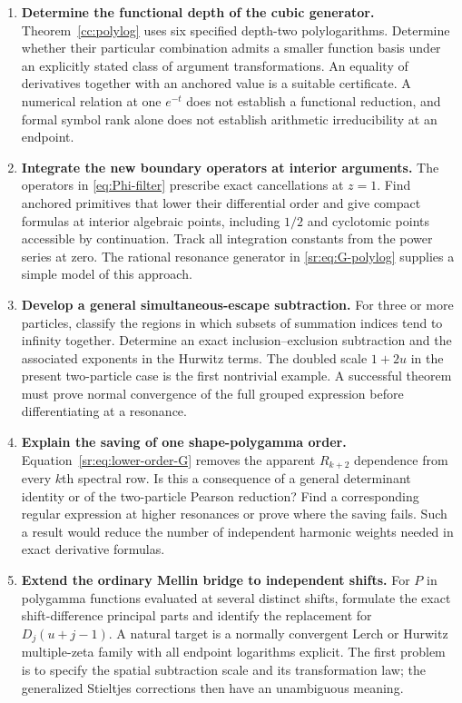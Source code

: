 \documentclass[11pt,letterpaper]{article}
\theoremstyle{definition}
\theoremstyle{remark}
\numberwithin{equation}{section}
\begin{document}
\begin{enumerate}[leftmargin=*,label=\textbf{Q\arabic*.}]
\item \textbf{Determine the functional depth of the cubic generator.}
Theorem~\ref{cc:polylog} uses six specified depth-two polylogarithms.
Determine whether their particular combination admits a smaller function
basis under an explicitly stated class of argument transformations.
An equality of derivatives together with an anchored value is a suitable
certificate. A numerical relation at one $e^{-t}$ does not establish a
functional reduction, and formal symbol rank alone does not establish
arithmetic irreducibility at an endpoint.

\item \textbf{Integrate the new boundary operators at interior arguments.}
The operators in \eqref{eq:Phi-filter} prescribe exact cancellations at
$z=1$. Find anchored primitives that lower their differential order and
give compact formulas at interior algebraic points, including $1/2$ and
cyclotomic points accessible by continuation. Track all integration
constants from the power series at zero. The rational resonance generator
in \eqref{sr:eq:G-polylog} supplies a simple model of this approach.

\item \textbf{Develop a general simultaneous-escape subtraction.}
For three or more particles, classify the regions in which subsets of
summation indices tend to infinity together. Determine an exact
inclusion--exclusion subtraction and the associated exponents in the
Hurwitz terms. The doubled scale $1+2u$ in the present two-particle
case is the first nontrivial example. A successful theorem must prove
normal convergence of the full grouped expression before differentiating
at a resonance.

\item \textbf{Explain the saving of one shape-polygamma order.}
Equation~\eqref{sr:eq:lower-order-G} removes the apparent $R_{k+2}$
dependence from every $k$th spectral row. Is this a consequence of a
general determinant identity or of the two-particle Pearson reduction?
Find a corresponding regular expression at higher resonances or prove
where the saving fails. Such a result would reduce the number of
independent harmonic weights needed in exact derivative formulas.

\item \textbf{Extend the ordinary Mellin bridge to independent shifts.}
For $P$ in polygamma functions evaluated at several distinct shifts,
formulate the exact shift-difference principal parts and identify the
replacement for $D_j(u+j-1)$. A natural target is a normally convergent
Lerch or Hurwitz multiple-zeta family with all endpoint logarithms
explicit. The first problem is to specify the spatial subtraction scale
and its transformation law; the generalized Stieltjes corrections then
have an unambiguous meaning.


\end{enumerate}
\end{document}
